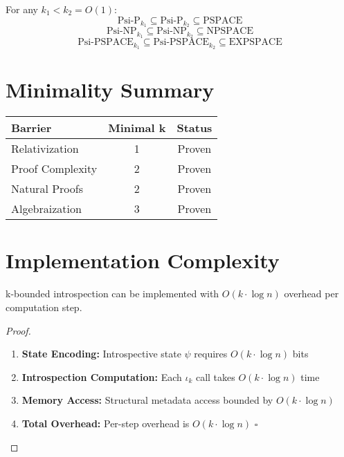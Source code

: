 \documentclass[11pt]{article}
\newcommand{\qed}{\hfill$\square$}
\begin{document}
\begin{theorem}
For any $k_1 < k_2 = O(1)$:
$$\text{Psi-P}_{k_1} \subseteq \text{Psi-P}_{k_2} \subseteq \text{PSPACE}$$
$$\text{Psi-NP}_{k_1} \subseteq \text{Psi-NP}_{k_2} \subseteq \text{NPSPACE}$$
$$\text{Psi-PSPACE}_{k_1} \subseteq \text{Psi-PSPACE}_{k_2} \subseteq \text{EXPSPACE}$$
\end{theorem}

\section{Minimality Summary}

\begin{center}
\begin{tabular}{|l|c|c|}
\hline
\textbf{Barrier} & \textbf{Minimal k} & \textbf{Status} \\
\hline
Relativization & 1 & Proven \\
Proof Complexity & 2 & Proven \\
Natural Proofs & 2 & Proven \\
Algebraization & 3 & Proven \\
\hline
\end{tabular}
\end{center}

\section{Implementation Complexity}

\begin{theorem}
k-bounded introspection can be implemented with $O(k \cdot \log n)$ overhead per computation step.
\end{theorem}

\begin{proof}
\begin{enumerate}
\item \textbf{State Encoding:} Introspective state $\psi$ requires $O(k \cdot \log n)$ bits
\item \textbf{Introspection Computation:} Each $\iota_k$ call takes $O(k \cdot \log n)$ time
\item \textbf{Memory Access:} Structural metadata access bounded by $O(k \cdot \log n)$
\item \textbf{Total Overhead:} Per-step overhead is $O(k \cdot \log n)$ \qed
\end{enumerate}
\end{proof}
\end{document}
